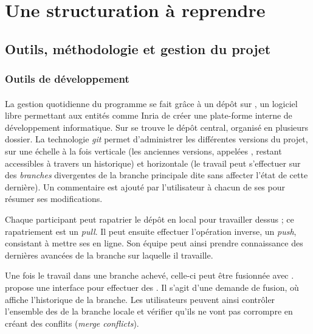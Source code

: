 \part{Une structuration à reprendre}

\clearpage
\thispagestyle{empty}
\cleardoublepage

\chapter{Outils, méthodologie et gestion du projet}


\section{Outils de développement}

\subsection{\gitlab}

La gestion quotidienne du programme \timeus{} se fait grâce à un dépôt sur \gitlab{}, un logiciel libre permettant aux entités comme Inria de créer une plate-forme interne de développement informatique. Sur \gitlab{} se trouve le dépôt central, organisé en plusieurs dossier. La technologie \textit{git} permet d'administrer les différentes versions du projet, sur une échelle à la fois verticale (les anciennes versions, appelées \commits, restant accessibles à travers un historique) et horizontale (le travail peut s'effectuer sur des \textit{branches} divergentes de la branche principale dite \master{} sans affecter l'état de cette dernière). Un commentaire est ajouté par l'utilisateur à chacun de ses \commits{} pour résumer ses modifications.

Chaque participant peut rapatrier le dépôt \gitlab{} en local pour travailler dessus ; ce rapatriement est un \textit{pull}. Il peut ensuite effectuer l'opération inverse, un \textit{push}, consistant à mettre ses \commits{} en ligne. Son équipe peut ainsi prendre connaissance des dernières avancées de la branche sur laquelle il travaille.

Une fois le travail dans une branche achevé, celle-ci peut être fusionnée avec \master. \gitlab{} propose une interface pour effectuer des \mergerequests{}. Il s'agit d'une demande de fusion, où \gitlab{} affiche l'historique de la branche. Les utilisateurs peuvent ainsi contrôler l'ensemble des \commits{} de la branche locale et vérifier qu'ils ne vont pas corrompre \master{} en créant des conflits (\textit{merge conflicts}).

